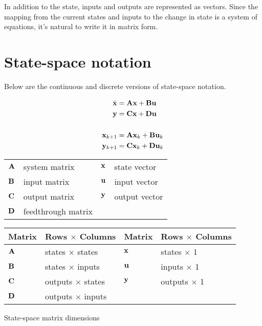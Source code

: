 In addition to the \gls{state}, \glspl{input} and \glspl{output} are represented
as vectors. Since the mapping from the current \glspl{state} and \glspl{input}
to the change in \gls{state} is a system of equations, it's natural to write it
in matrix form.

\section{State-space notation}

Below are the continuous and discrete versions of state-space notation.

\begin{definition}%

  \begin{align}
    \dot{\mathbf{x}} &= \mathbf{A}\mathbf{x} + \mathbf{B}\mathbf{u} \label{eq:ss_ctrl_x} \\
    \mathbf{y} &= \mathbf{C}\mathbf{x} + \mathbf{D}\mathbf{u} \label{eq:ss_ctrl_y} \\
    \nonumber \\
    \mathbf{x}_{k+1} &= \mathbf{A}\mathbf{x}_k + \mathbf{B}\mathbf{u}_k \label{eq:ssz_ctrl_x} \\
    \mathbf{y}_{k+1} &= \mathbf{C}\mathbf{x}_k + \mathbf{D}\mathbf{u}_k \label{eq:ssz_ctrl_y}
  \end{align}

  \begin{figurekey}
    \begin{tabulary}{\linewidth}{LLLL}
      $\mathbf{A}$ & system matrix      & $\mathbf{x}$ & state vector \\
      $\mathbf{B}$ & input matrix       & $\mathbf{u}$ & input vector \\
      $\mathbf{C}$ & output matrix      & $\mathbf{y}$ & output vector \\
      $\mathbf{D}$ & feedthrough matrix &  &  \\
    \end{tabulary}
  \end{figurekey}
\end{definition}

\begin{booktable}
  \begin{tabular}{|ll|ll|}
    \hline
    \rowcolor{headingbg}
    \textbf{Matrix} & \textbf{Rows $\times$ Columns} &
    \textbf{Matrix} & \textbf{Rows $\times$ Columns} \\
    \hline
    $\mathbf{A}$ & states $\times$ states & $\mathbf{x}$ & states $\times$ 1 \\
    $\mathbf{B}$ & states $\times$ inputs & $\mathbf{u}$ & inputs $\times$ 1 \\
    $\mathbf{C}$ & outputs $\times$ states & $\mathbf{y}$ & outputs $\times$ 1 \\
    $\mathbf{D}$ & outputs $\times$ inputs &  &  \\
    \hline
  \end{tabular}
  \caption{State-space matrix dimensions}
  \label{tab:ss_matrix_dims}
\end{booktable}

